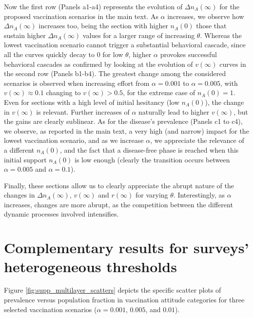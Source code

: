 \documentclass[
 reprint,
 amsmath,amssymb,
 aps,
]{revtex4-2}
\begin{document}
Now the first row (Panels a1-a4) represents the evolution of $\Delta n_A(\infty)$ for the proposed vaccination scenarios in the main text. As $\alpha$ increases, we observe how $\Delta n_A(\infty)$ increases too, being the section with higher $n_A(0)$ those that sustain higher $\Delta n_A(\infty)$ values for a larger range of increasing $\theta$. Whereas the lowest vaccination scenario cannot trigger a substantial behavioral cascade, since all the curves quickly decay to $0$ for low $\theta$, higher $\alpha$ provokes successful behavioral cascades as confirmed by looking at the evolution of $v(\infty)$ curves in the second row (Panels b1-b4). The greatest change among the considered scenarios is observed when increasing effort from $\alpha=0.001$ to $\alpha=0.005$, with $v(\infty)\approx 0.1$ changing to $v(\infty)>0.5$, for the extreme case of $n_A(0)=1$. Even for sections with a high level of initial hesitancy (low $n_A(0)$), the change in $v(\infty)$ is relevant. Further increases of $\alpha$ naturally lead to higher $v(\infty)$, but the gains are clearly sublinear. As for the disease's prevalence (Panels c1 to c4), we observe, as reported in the main text, a very high (and narrow) impact for the lowest vaccination scenario, and as we increase $\alpha$, we appreciate the relevance of a different $n_A(0)$, and the fact that a disease-free phase is reached when this initial support $n_A(0)$ is low enough (clearly the transition occurs between $\alpha=0.005$ and $\alpha=0.1$). 

Finally, these sections allow us to clearly appreciate the abrupt nature of the changes in $\Delta n_A(\infty)$, $v(\infty)$ and $r(\infty)$ for varying $\theta$. Interestingly, as $\alpha$ increases, changes are more abrupt, as the competition between the different dynamic processes involved intensifies.

\section{Complementary results for surveys' heterogeneous thresholds}
\label{app:scatters}

\setcounter{figure}{0}

Figure \ref{fig:supp_multilayer_scatters} depicts the specific scatter plots of prevalence versus population fraction in vaccination attitude categories for three selected vaccination scenarios ($\alpha=0.001$, $0.005$, and $0.01$).
\end{document}
